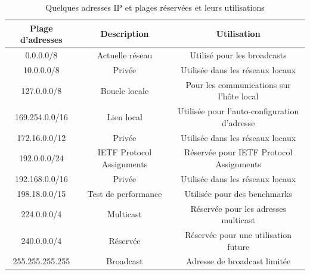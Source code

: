 \documentclass[12pt]{article}
\begin{document}
\begin{table}[h]
    \centering
    \begin{tabular}{|c|c|c|}
    \hline
    Plage d'adresses & Description & Utilisation \\
    \hline
    0.0.0.0/8 & Actuelle réseau & Utilisé pour les broadcasts \\
    \hline
    10.0.0.0/8 & Privée & Utilisée dans les réseaux locaux \\
    \hline
    127.0.0.0/8 & Boucle locale & Pour les communications sur l'hôte local \\
    \hline
    169.254.0.0/16 & Lien local & Utilisée pour l'auto-configuration d'adresse \\
    \hline
    172.16.0.0/12 & Privée & Utilisée dans les réseaux locaux \\
    \hline
    192.0.0.0/24 & IETF Protocol Assignments & Réservée pour IETF Protocol Assignments \\
    \hline
    192.168.0.0/16 & Privée & Utilisée dans les réseaux locaux \\
    \hline
    198.18.0.0/15 & Test de performance & Utilisée pour des benchmarks \\
    \hline
    224.0.0.0/4 & Multicast & Réservée pour les adresses multicast \\
    \hline
    240.0.0.0/4 & Réservée & Réservée pour une utilisation future \\
    \hline
    255.255.255.255 & Broadcast & Adresse de broadcast limitée \\
    \hline
    \end{tabular}
    \caption{Quelques adresses IP et plages réservées et leurs utilisations}
    \label{tab:ip_reserved}
\end{table}
\end{document}
